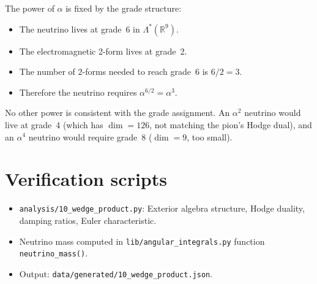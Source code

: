 \documentclass[11pt,letterpaper]{article}
\numberwithin{equation}{section}
\begin{document}
The power of $\alpha$ is fixed by the grade structure:
\begin{itemize}
  \item The neutrino lives at grade~6 in $\Lambda^*(\mathbb{R}^9)$.
  \item The electromagnetic 2-form lives at grade~2.
  \item The number of 2-forms needed to reach grade~6 is $6/2 = 3$.
  \item Therefore the neutrino requires $\alpha^{6/2} = \alpha^3$.
\end{itemize}

No other power is consistent with the grade assignment. An $\alpha^2$
neutrino would live at grade~4 (which has $\dim = 126$, not matching the
pion's Hodge dual), and an $\alpha^4$ neutrino would require grade~8
($\dim = 9$, too small).

\section{Verification scripts}
\label{sec:verification}

\begin{itemize}
  \item \texttt{analysis/10\_wedge\_product.py}: Exterior algebra structure,
    Hodge duality, damping ratios, Euler characteristic.
  \item Neutrino mass computed in \texttt{lib/angular\_integrals.py}
    function \texttt{neutrino\_mass()}.
  \item Output: \texttt{data/generated/10\_wedge\_product.json}.
\end{itemize}
\end{document}
